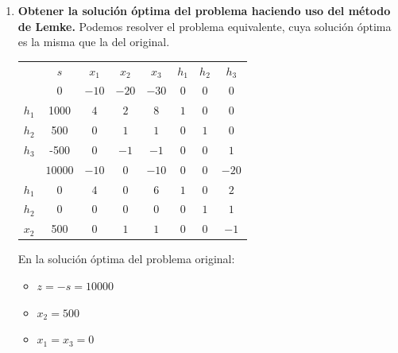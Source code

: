 \begin{enumerate}
    Y, finalmente, podemos formular el problema en forma estándar, que sí cumple con los requisitos para poder aplicar el método de Lemke.

    \begin{equation}
    \begin{split}
    \mbox{max. } s = -10x_1 - 20x_2 - 30x_3\\
    s.a.:\\
    4x_1 + 2x_2 + 8x_3 + h_1 = 1000\\
    1x_2 + 1x_3 + h_2 = 500\\
    1x_2 + 1x_3 - h_3 = 500\\
    x_1,\,\,x_2,\,\,x_3,\,\,h_1,\,\,h_2,\,\,h_3\geq 0\\
    \end{split}
    \end{equation}

    
    \item \textbf{Obtener la solución óptima del problema haciendo uso del método de Lemke.}
    Podemos resolver el problema equivalente, cuya solución óptima es la misma que la del original.

    \begin{center}
    \begin{tabular}{c|c|cccccc|}
     & $s$ & $x_1$ & $x_2$ & $x_3$ & $h_1$ & $h_2$ & $h_3$\\
     & $0$ & $-10$ & $-20$ & $-30$ & $0$ & $0$ & $0$ \\
    \hline
    $h_1$ & 1000  & $4$ & $2$ & $8$ & $1$ & $0$ & $0$\\
    $h_2$ & 500  & $0$ & $1$ & $1$ & $0$ & $1$ & $0$\\
    $h_3$ & -500  & $0$ & $-1$ & $-1$ & $0$ & $0$ & $1$\\
    \hline
          & $10000$ & $-10$ & $0$ & $-10$ & $0$ & $0$ & $-20$ \\
    \hline
    $h_1$ & 0  & $4$ & $0$ & $6$ & $1$ & $0$ & $2$\\
    $h_2$ & 0  & $0$ & $0$ & $0$ & $0$ & $1$ & $1$\\
    $x_2$ & 500  & $0$ & $1$ & $1$ & $0$ & $0$ & $-1$\\
    \hline
    \end{tabular}
    \end{center}

    En la solución óptima del problema original:
    \begin{itemize}
        \item $z=-s=10000$
        \item $x_2=500$
        \item $x_1=x_3=0$
    \end{itemize}



    
\end{enumerate}
